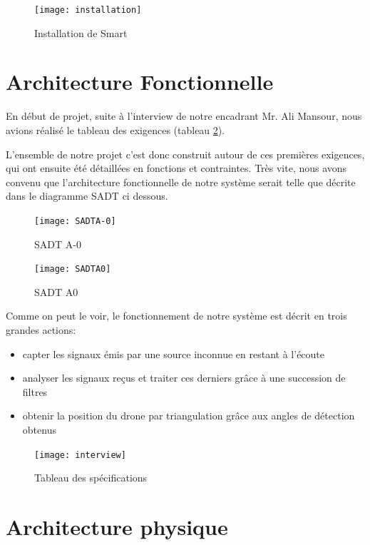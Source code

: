 \begin{figure}[!h]
  \centering
  \texttt{[image: installation]}
  \caption{Installation de Smart}
  \label{fig:inst}
\end{figure}


\section{Architecture Fonctionnelle}
En début de projet, suite à l'interview de notre encadrant Mr. Ali Mansour, nous avions réalisé le tableau des exigences (tableau \ref{pdf:tab}).


L'ensemble de notre projet c'est donc construit autour de ces premières exigences, qui ont ensuite été détaillées en fonctions et contraintes. Très vite, nous avons convenu que l'architecture fonctionnelle de notre système serait telle que décrite dans le diagramme SADT ci dessous.

\begin{figure}[h]

    \centering
    \texttt{[image: SADTA-0]}
    \caption{SADT A-0}
    
\end{figure}
\begin{figure}[h]
      
    
    \centering
    \texttt{[image: SADTA0]}
    \caption{SADT A0}

\end{figure}




Comme on peut le voir, le fonctionnement de notre système est décrit en trois grandes actions: 
\begin{itemize}
\item capter les signaux émis par une source inconnue en restant à l'écoute
\item analyser les signaux reçus et traiter ces derniers grâce à une succession de filtres
\item obtenir la position du drone par triangulation grâce aux angles de détection obtenus
\end{itemize}


\begin{figure}[h]
  \centering
  \texttt{[image: interview]}
  \caption{Tableau des spécifications}
  \label{pdf:tab}
\end{figure}

 




\section{Architecture physique}
\label{sec:phys}

